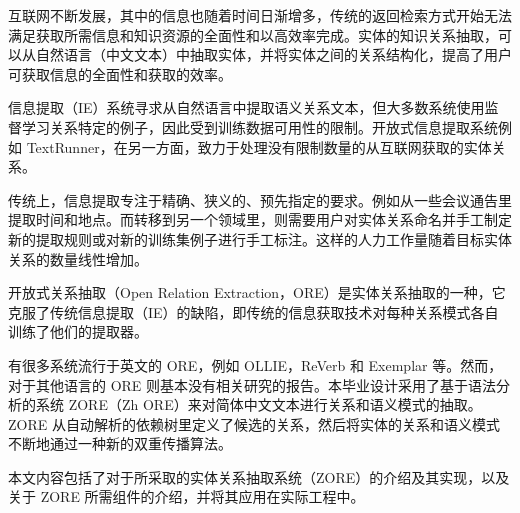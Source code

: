 ﻿\begin{cnabstract}
互联网不断发展，其中的信息也随着时间日渐增多，传统的返回检索方式开始无法满足获取所需信息和知识资源的全面性和以高效率完成。实体的知识关系抽取，可以从自然语言（中文文本）中抽取实体，并将实体之间的关系结构化，提高了用户可获取信息的全面性和获取的效率。

信息提取（IE）系统寻求从自然语言中提取语义关系文本，但大多数系统使用监督学习关系特定的例子，因此受到训练数据可用性的限制。开放式信息提取系统例如 TextRunner，在另一方面，致力于处理没有限制数量的从互联网获取的实体关系。

传统上，信息提取专注于精确、狭义的、预先指定的要求。例如从一些会议通告里提取时间和地点。而转移到另一个领域里，则需要用户对实体关系命名并手工制定新的提取规则或对新的训练集例子进行手工标注。这样的人力工作量随着目标实体关系的数量线性增加。

开放式关系抽取（Open Relation Extraction，ORE）是实体关系抽取的一种，它克服了传统信息提取（IE）的缺陷，即传统的信息获取技术对每种关系模式各自训练了他们的提取器。

有很多系统流行于英文的 ORE，例如 OLLIE，ReVerb 和 Exemplar 等。然而，对于其他语言的 ORE 则基本没有相关研究的报告。本毕业设计采用了基于语法分析的系统 ZORE（Zh ORE）来对简体中文文本进行关系和语义模式的抽取。ZORE 从自动解析的依赖树里定义了候选的关系，然后将实体的关系和语义模式不断地通过一种新的双重传播算法。

本文内容包括了对于所采取的实体关系抽取系统（ZORE）的介绍及其实现，以及关于 ZORE 所需组件的介绍，并将其应用在实际工程中。

\end{cnabstract}


